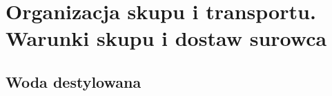 \section{Organizacja skupu i transportu. Warunki skupu i dostaw surowca}

\subsection{Woda destylowana}
%
%
%
%
%
%
%
%
%
%
%
%
